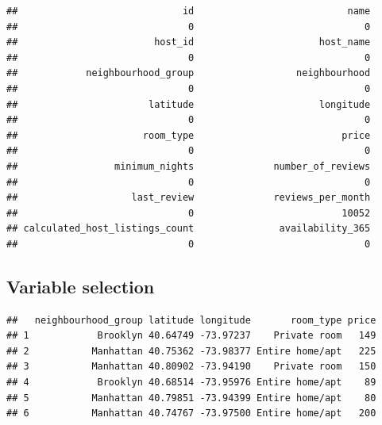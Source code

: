 \documentclass[
]{article}
\newenvironment{Shaded}{\begin{snugshade}}{\end{snugshade}}
\newcommand{\KeywordTok}[1]{\textcolor[rgb]{0.13,0.29,0.53}{\textbf{#1}}}
\newcommand{\NormalTok}[1]{#1}
\newcommand{\OperatorTok}[1]{\textcolor[rgb]{0.81,0.36,0.00}{\textbf{#1}}}
\newcommand{\StringTok}[1]{\textcolor[rgb]{0.31,0.60,0.02}{#1}}
\begin{document}
\begin{verbatim}
##                             id                           name 
##                              0                              0 
##                        host_id                      host_name 
##                              0                              0 
##            neighbourhood_group                  neighbourhood 
##                              0                              0 
##                       latitude                      longitude 
##                              0                              0 
##                      room_type                          price 
##                              0                              0 
##                 minimum_nights              number_of_reviews 
##                              0                              0 
##                    last_review              reviews_per_month 
##                              0                          10052 
## calculated_host_listings_count               availability_365 
##                              0                              0
\end{verbatim}

\hypertarget{variable-selection}{%
\subsection{Variable selection}\label{variable-selection}}

\begin{Shaded}
\end{Shaded}

\begin{verbatim}
##   neighbourhood_group latitude longitude       room_type price
## 1            Brooklyn 40.64749 -73.97237    Private room   149
## 2           Manhattan 40.75362 -73.98377 Entire home/apt   225
## 3           Manhattan 40.80902 -73.94190    Private room   150
## 4            Brooklyn 40.68514 -73.95976 Entire home/apt    89
## 5           Manhattan 40.79851 -73.94399 Entire home/apt    80
## 6           Manhattan 40.74767 -73.97500 Entire home/apt   200
\end{verbatim}
\end{document}
